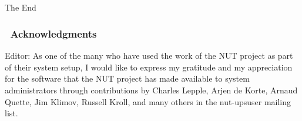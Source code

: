 \documentclass[12pt]{article}
\def\isodate{\leavevmode\hbox{\the\year-\twodigits\month-\twodigits\day}}
\def\twodigits#1{\ifnum#1<10 0\fi\the#1}
\newcommand{\Version}{3.0}
\renewcommand{\thepage}{}            %
\newlength{\headersep}\setlength{\headersep}{3mm}
\newcommand{\Hsep}{\hspace{\headersep}}
\newcommand{\newcolumn}{\vfill\eject}
\begin{document}

\begin{center}
\part[\hspace{\fill}\textsf{The End}\hspace{\fill}]{}\label{part:End}
\vspace{5mm}
\textsf{\huge{The End}}
\vspace{7mm}
\end{center}

\section{\Hsep\ Acknowledgments}\label{acks}

Editor: As one of the many who have used the work of the NUT project as part
of their system setup, I would like to express my gratitude and my
appreciation for the software that the NUT project has made available to
system administrators through contributions by Charles Lepple, Arjen de Korte,
Arnaud Quette, Jim Klimov, Russell Kroll, and many others in the nut-upsuser
mailing list.
\end{document}
